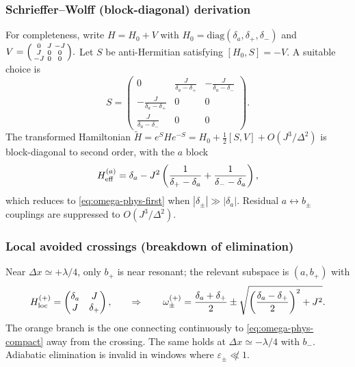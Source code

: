 \subsubsection*{Schrieffer--Wolff (block-diagonal) derivation}
For completeness, write \(H=H_0+V\) with
\(
H_0=\mathrm{diag}(\delta_a,\delta_+,\delta_-)
\)
and
\(
V=\begin{psmallmatrix}
0 & J & -J\\ J & 0 & 0\\ -J & 0 & 0
\end{psmallmatrix}.
\)
Let \(S\) be anti-Hermitian satisfying \([H_0,S]=-V\).
A suitable choice is
\begin{equation}
S = 
\begin{pmatrix}
0 & \frac{J}{\delta_a-\delta_+} & -\frac{J}{\delta_a-\delta_-}\\[2pt]
-\frac{J}{\delta_a-\delta_+} & 0 & 0\\[2pt]
\frac{J}{\delta_a-\delta_-} & 0 & 0
\end{pmatrix}.
\end{equation}
The transformed Hamiltonian \(\tilde H=e^{S}He^{-S}=H_0+\frac{1}{2}[S,V]+O(J^3/\Delta^2)\) is block-diagonal to second order, with the \(a\) block
\begin{equation}
\label{eq:SW-effective}
H_{\rm eff}^{(a)}=\delta_a
- J^2\left(\frac{1}{\delta_+-\delta_a}+\frac{1}{\delta_--\delta_a}\right),
\end{equation}
which reduces to \eqref{eq:omega-phys-first} when \(|\delta_\pm|\gg |\delta_a|\). Residual \(a\!\leftrightarrow\!b_\pm\) couplings are suppressed to \(O(J^3/\Delta^2)\).

\subsubsection*{Local avoided crossings (breakdown of elimination)}
Near \(\Delta x\simeq +\lambda/4\), only \(b_+\) is near resonant; the relevant subspace is \((a,b_+)\) with
\begin{equation}
H_{\rm loc}^{(+)}=
\begin{pmatrix}
\delta_a & J\\ J & \delta_+
\end{pmatrix},
\qquad
\Rightarrow\qquad
\omega_{\pm}^{(+)}=\frac{\delta_a+\delta_+}{2}\pm
\sqrt{\left(\frac{\delta_a-\delta_+}{2}\right)^2+J^2}.
\end{equation}
The orange branch is the one connecting continuously to \eqref{eq:omega-phys-compact} away from the crossing. The same holds at \(\Delta x\simeq -\lambda/4\) with \(b_-\).
Adiabatic elimination is invalid in windows where \(\varepsilon_\pm\not\ll1\).

